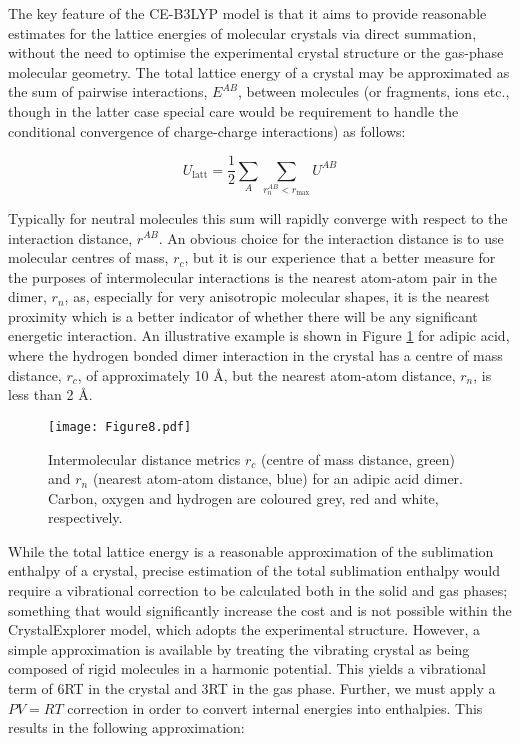 \documentclass[twoside,twocolumn,9pt]{article}
\begin{document}
The key feature of the CE-B3LYP model is that it aims to provide reasonable estimates for the lattice energies of molecular crystals via direct summation, without the need to optimise the experimental crystal structure or the gas-phase molecular geometry. The total lattice energy of a crystal may be approximated as the sum of pairwise interactions, $E^{AB}$, between molecules (or fragments, ions etc.,
though in the latter case special care would be requirement to handle the conditional convergence of charge-charge interactions) as follows:

\begin{equation}
    U_{\textrm{latt}} = \frac{1}{2} \sum_{A} \sum_{r_n^{AB} < r_{\textrm{max}}} U^{AB} 
\end{equation}

Typically for neutral molecules this sum will rapidly converge with respect to the interaction distance,
$r^{AB}$. An obvious choice for the interaction distance is to use molecular centres of mass, $r_c$, 
but it is our experience that a better measure for the purposes of intermolecular interactions is the nearest atom-atom pair in the dimer, $r_n$, as, especially for very anisotropic molecular shapes, it is the nearest proximity which is a better indicator of whether there will be any significant energetic interaction. An illustrative example is shown in Figure \ref{fig:adipic_distances} for adipic acid, 
where the hydrogen bonded dimer interaction in the crystal has a centre of mass distance, $r_c$, of approximately 10 Å, but the nearest atom-atom distance, $r_n$, is less than 2 Å. 

\begin{figure}
\centering
  \texttt{[image: Figure8.pdf]}
\caption{Intermolecular distance metrics $r_c$ (centre of mass distance, green) and $r_n$ (nearest atom-atom distance, blue) for an adipic acid dimer. Carbon, oxygen and hydrogen are coloured grey, red and white, respectively.
}
\label{fig:adipic_distances}

\end{figure}


While the total lattice energy is a reasonable approximation of the sublimation enthalpy of a crystal, precise estimation of the total sublimation enthalpy would require a vibrational correction to be calculated both in the solid and gas phases; something that would significantly increase the cost and is not possible within the CrystalExplorer model, which adopts the experimental structure. However, a simple approximation is available by treating the vibrating crystal as being composed of rigid molecules in a harmonic potential. This yields a vibrational term of 6RT in the crystal and 3RT in the gas phase. Further, we must apply a $PV=RT$ correction in order to convert internal energies into enthalpies. This results in the following approximation:
\end{document}
